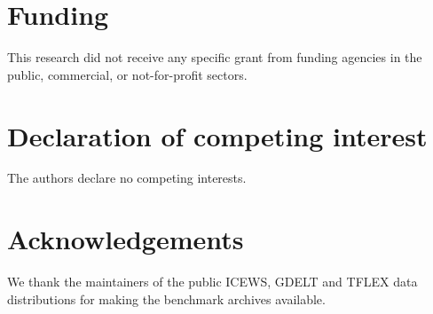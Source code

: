 \documentclass[preprint,12pt]{elsarticle}
\begin{document}
\section*{Funding}
This research did not receive any specific grant from funding agencies in the public, commercial, or not-for-profit sectors.

\section*{Declaration of competing interest}
The authors declare no competing interests.

\section*{Acknowledgements}
We thank the maintainers of the public ICEWS, GDELT and TFLEX data distributions for making the benchmark archives available.

\fontsize{9}{10.6}\selectfont
\setlength{\bibsep}{0pt}


\end{document}
